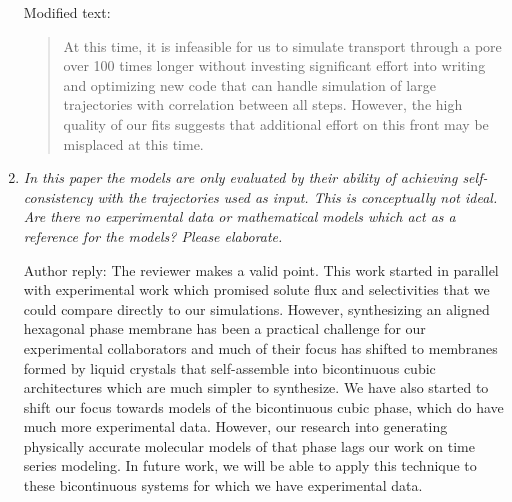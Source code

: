 \documentclass{article}
\begin{document}
\begin{enumerate}[label={Comment \theenumi :}, leftmargin=3.9\parindent]
	  	Modified text:
	  	\begin{quote}
	  	At this time, it is infeasible for us to simulate transport through a pore over 100 times
	  	longer without investing significant effort into writing and optimizing new code that can
	  	handle simulation of large trajectories with correlation between all steps. 
	  	However, the high quality of our fits suggests that additional effort on this front may be
	  	misplaced at this time. 
	  	\end{quote}
  
  \item \textit{In this paper the models are only evaluated by their ability of achieving 
		  self-consistency with the trajectories used as input. This is conceptually not ideal. 
		  Are there no experimental data or mathematical models which act as a reference for 
		  the models? Please elaborate.}
		  
		  Author reply: The reviewer makes a valid point. This work started in parallel with experimental
		  work which promised solute flux and selectivities that we could compare directly to our
		  simulations. However, synthesizing an aligned hexagonal phase membrane has been a practical
		  challenge for our experimental collaborators and much of their focus has shifted to 
		  membranes formed by liquid crystals that self-assemble into bicontinuous cubic architectures
		  which are much simpler to synthesize. We have also started to shift our focus towards models 
		  of the bicontinuous cubic phase, which do have much more experimental data. However, our 
		  research into generating physically accurate molecular models of that phase lags our work on
		  time series modeling. In future work, we will be able to apply this technique to these 
		  bicontinuous systems for which we have experimental data.
		  

                  

\end{enumerate}
\end{document}
